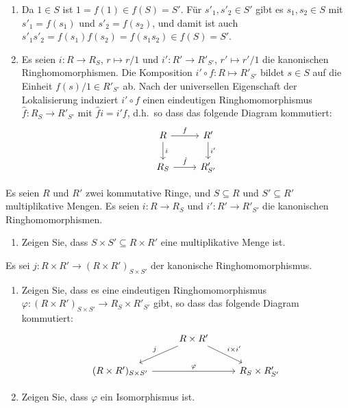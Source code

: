 \begin{solution}
  \begin{enumerate}
    \item
      Da $1 \in S$ ist $1 = f(1) \in f(S) = S'$.
      Für $s'_1, s'_2 \in S'$ gibt es $s_1, s_2 \in S$ mit $s'_1 = f(s_1)$ und $s'_2 = f(s_2)$, und damit ist auch $s'_1 s'_2 = f(s_1) f(s_2) = f(s_1 s_2) \in f(S) = S'$.
    \item
      Es seien $i \colon R \to R_S$, $r \mapsto r/1$ und $i' \colon R' \to R'_{S'}$, $r' \mapsto r'/1$ die kanonischen Ringhomomorphismen.
      Die Komposition $i' \circ f \colon R \mapsto R'_{S'}$ bildet $s \in S$ auf die Einheit $f(s)/1 \in R'_{S'}$
      ab.
      Nach der universellen Eigenschaft der Lokalisierung induziert $i' \circ f$ einen eindeutigen Ringhomomorphismus $\hat{f} \colon R_S \to R'_{S'}$ mit $\hat{f} i = i' f$, d.h.\ so dass das folgende Diagram kommutiert:
      \[
        \begin{tikzcd}[ampersand replacement = \&]
              R
              \arrow{r}{f}
              \arrow{d}{i}
          \&  R'
              \arrow{d}{i'}
          \\
              R_S
              \arrow{r}{\hat{f}}
          \&  R'_{S'}
        \end{tikzcd}
      \]
  \end{enumerate}
\end{solution}


\begin{question}
  Es seien $R$ und $R'$ zwei kommutative Ringe, und $S \subseteq R$ und $S' \subseteq R'$ multiplikative Mengen.
  Es seien $i \colon R \to R_S$ und $i' \colon R' \to R'_{S'}$ die kanonischen Ringhomomorphismen.
  \begin{enumerate}
    \item
      Zeigen Sie, dass $S \times S' \subseteq R \times R'$ eine multiplikative Menge ist.
  \end{enumerate}
  Es sei $j \colon R \times R' \to (R \times R')_{S \times S'}$ der kanonische Ringhomomorphismus.
  \begin{enumerate}[resume]
    \item
      Zeigen Sie, dass es eine eindeutigen Ringhomomorphismus $\varphi \colon (R \times R')_{S \times S'} \to R_S \times R'_{S'}$ gibt, so dass das folgende Diagram kommutiert:
      \[
        \begin{tikzcd}[ampersand replacement = \&]
              {}
          \&  R \times R'
              \arrow{dl}[swap]{j}
              \arrow{dr}{i \times i'}
              {}
          \\
              (R \times R')_{S \times S'}
              \arrow{rr}{\varphi}
          \&  {}
          \&  R_S \times R'_{S'}
        \end{tikzcd}
      \]
    \item
      Zeigen Sie, dass $\varphi$ ein Isomorphismus ist.
  \end{enumerate}
\end{question}


